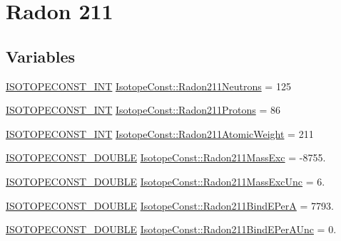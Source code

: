 \hypertarget{group___isotope_const-_radon-_rn211}{}\section{Radon 211}
\label{group___isotope_const-_radon-_rn211}
\subsection*{Variables}
\begin{DoxyCompactItemize}
\item 
\mbox{\hyperlink{group___isotope_const-_macros_ga5f18360b3e99483a35c32d789e62621c}{I\+S\+O\+T\+O\+P\+E\+C\+O\+N\+S\+T\+\_\+\+I\+NT}} \mbox{\hyperlink{group___isotope_const-_radon-_rn211_gab7296c4ebcbba442fd0c861c4e2851e3}{Isotope\+Const\+::\+Radon211\+Neutrons}} = 125
\item 
\mbox{\hyperlink{group___isotope_const-_macros_ga5f18360b3e99483a35c32d789e62621c}{I\+S\+O\+T\+O\+P\+E\+C\+O\+N\+S\+T\+\_\+\+I\+NT}} \mbox{\hyperlink{group___isotope_const-_radon-_rn211_gab73672f6ce34058ccb114980a4a053f7}{Isotope\+Const\+::\+Radon211\+Protons}} = 86
\item 
\mbox{\hyperlink{group___isotope_const-_macros_ga5f18360b3e99483a35c32d789e62621c}{I\+S\+O\+T\+O\+P\+E\+C\+O\+N\+S\+T\+\_\+\+I\+NT}} \mbox{\hyperlink{group___isotope_const-_radon-_rn211_ga3cbca6bce298e851294621858901f86e}{Isotope\+Const\+::\+Radon211\+Atomic\+Weight}} = 211
\item 
\mbox{\hyperlink{group___isotope_const-_macros_ga8f45a7272ce02c0b4c65c44636ed719a}{I\+S\+O\+T\+O\+P\+E\+C\+O\+N\+S\+T\+\_\+\+D\+O\+U\+B\+LE}} \mbox{\hyperlink{group___isotope_const-_radon-_rn211_ga6dfa8a616f1d4afab8c938693790b7ae}{Isotope\+Const\+::\+Radon211\+Mass\+Exc}} = -\/8755.
\item 
\mbox{\hyperlink{group___isotope_const-_macros_ga8f45a7272ce02c0b4c65c44636ed719a}{I\+S\+O\+T\+O\+P\+E\+C\+O\+N\+S\+T\+\_\+\+D\+O\+U\+B\+LE}} \mbox{\hyperlink{group___isotope_const-_radon-_rn211_ga3a77ba61eb74c68c10b2c9f075cbf144}{Isotope\+Const\+::\+Radon211\+Mass\+Exc\+Unc}} = 6.
\item 
\mbox{\hyperlink{group___isotope_const-_macros_ga8f45a7272ce02c0b4c65c44636ed719a}{I\+S\+O\+T\+O\+P\+E\+C\+O\+N\+S\+T\+\_\+\+D\+O\+U\+B\+LE}} \mbox{\hyperlink{group___isotope_const-_radon-_rn211_ga82ca7bb2e4a131a7fa32de83bbd7f8c0}{Isotope\+Const\+::\+Radon211\+Bind\+E\+PerA}} = 7793.
\item 
\mbox{\hyperlink{group___isotope_const-_macros_ga8f45a7272ce02c0b4c65c44636ed719a}{I\+S\+O\+T\+O\+P\+E\+C\+O\+N\+S\+T\+\_\+\+D\+O\+U\+B\+LE}} \mbox{\hyperlink{group___isotope_const-_radon-_rn211_ga59712bceb93728e662c83def44dcb9b7}{Isotope\+Const\+::\+Radon211\+Bind\+E\+Per\+A\+Unc}} = 0.

\end{DoxyCompactItemize}
